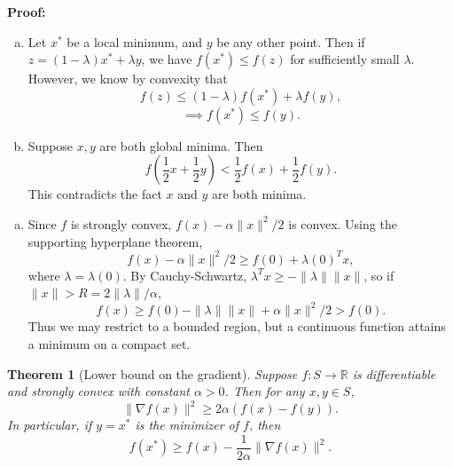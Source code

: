 \documentclass[12pt]{article}
\newtheorem{theorem}{Theorem}[section]
\theoremstyle{definition}
\theoremstyle{remark}
\begin{document}
\begin{adjustbox}{minipage = \columnwidth - 25.5pt, margin=1em, frame=1pt, margin=0em}
\textbf{Proof:}
\begin{enumerate}[(a)]
	\item Let $x^{\ast}$ be a local minimum, and $y$ be any other point. Then if $z = (1 - \lambda)x^{\ast} + \lambda y$, we have $f(x^{\ast}) \leq f(z)$ for sufficiently small $\lambda$. However, we know by convexity that
		\[
			f(z) \leq (1 - \lambda) f(x^{\ast}) + \lambda f(y)
		,\]
		\[
			\implies f(x^{\ast}) \leq f(y)
		.\]
	\item Suppose $x, y$ are both global minima. Then
		\[
			f \left( \frac{1}{2} x + \frac{1}{2} y \right) < \frac{1}{2} f(x) + \frac{1}{2} f(y)
		.\]
		This contradicts the fact $x$ and $y$ are both minima.
\end{enumerate}

\end{adjustbox}

\begin{adjustbox}{minipage = \columnwidth - 25.5pt, margin=1em, frame=1pt, margin=0em}

	\begin{enumerate}[(a), start = 3]
	\item Since $f$ is strongly convex, $f(x) - \alpha\|x\|^2/2$ is convex. Using the supporting hyperplane theorem,
		\[
			f(x) - \alpha \|x\|^2/2 \geq f(0) + \lambda(0)^{T} x
		,\]
		where $\lambda = \lambda(0)$. By Cauchy-Schwartz, $\lambda^{T}x \geq -\|\lambda\|\|x\|$, so if $\|x\| > R = 2\|\lambda\|/\alpha$,
		\[
			f(x) \geq f(0) - \|\lambda\|\|x\| + \alpha\|x\|^2/2 > f(0)
		.\]
		Thus we may restrict to a bounded region, but a continuous function attains a minimum on a compact set.

\end{enumerate}

\end{adjustbox}

\begin{theorem}[Lower bound on the gradient]
\label{thm:LBG}
	Suppose $f : S \to \mathbb{R}$ is differentiable and strongly convex with constant $\alpha > 0$. Then for any $x, y \in S$,
	\[
		\|\nabla f(x)\|^2 \geq 2 \alpha(f(x) - f(y))
	.\]
	In particular, if $y = x^{\ast}$ is the minimizer of $f$, then
	\[
		f(x^{\ast}) \geq f(x) - \frac{1}{2\alpha} \|\nabla f(x)\|^2
	.\]
\end{theorem}
\end{document}
